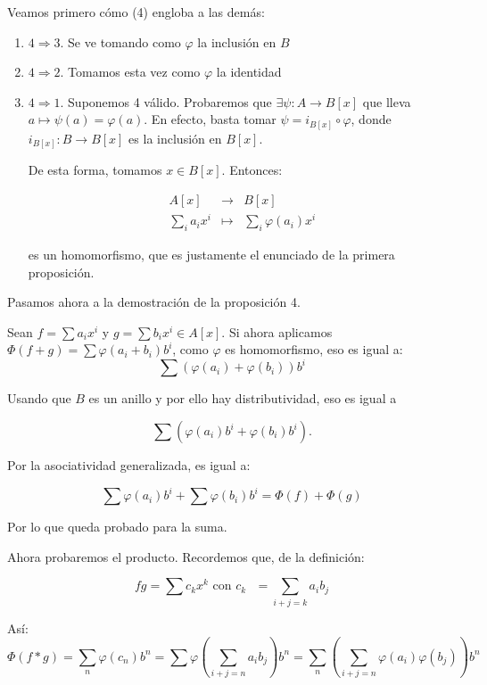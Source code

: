 \documentclass[11pt, a4paper, titlepage]{article}
\makeatletter
\renewenvironment{proof}[1][\proofname] {\vspace{-15pt}\par\pushQED{\qed}\normalfont\topsep6\p@\@plus6\p@\relax\trivlist\item[\hskip\labelsep\it#1\@addpunct{.}]\ignorespaces}{\popQED\endtrivlist\@endpefalse}
\theoremstyle{theorem-style}
\theoremstyle{definition-style}
\theoremstyle{remark-style}
\theoremstyle{example-style}
\newenvironment{nlist}
{\begin{enumerate}
\renewcommand\labelenumi{(\emph{\roman{enumi})}}}
{\end{enumerate}}
\makeatother
\begin{document}
\begin{proof}
Veamos primero cómo (4) engloba a las demás:
\begin{nlist}

\item $4 \Rightarrow 3$. Se ve tomando como $\varphi$ la inclusión en $B$
\item $4 \Rightarrow 2$. Tomamos esta vez como $\varphi$ la identidad
\item $4 \Rightarrow 1$. Suponemos 4 válido. Probaremos que $\exists\psi: A \to B[x]$ que lleva $a \mapsto \psi(a) = \varphi(a)$.
  En efecto, basta tomar $\psi = i_{B[x]} \circ \varphi$, donde $i_{B[x]} : B \to B[x]$ es la inclusión en $B[x]$.


De esta forma, tomamos $x\in B[x]$. Entonces:

\[
\begin{array}{lll}
  
  A[x] & \to & B[x] \\
  \sum_i a_i x^i & \mapsto & \sum_i \varphi(a_i)x^i
\end{array}
\]

es un homomorfismo, que es justamente el enunciado de la primera proposición.

\end{nlist}

Pasamos ahora a la demostración de la proposición 4.


Sean $f = \sum a_i x^i$ y $g = \sum b_i x^i \in A[x]$.
Si ahora aplicamos $\Phi(f+g) = \sum \varphi(a_i + b_i)b^i$, como $\varphi$ es homomorfismo, eso es igual a:
\[
    \sum (\varphi(a_i) + \varphi(b_i))b^i
\]
 
Usando que $B$ es un anillo y por ello hay distributividad, eso es igual a

\[
    \sum (\varphi(a_i)b^i + \varphi(b_i)b^i).
\]
 
Por la asociatividad generalizada, es igual a:

\[
\sum \varphi(a_i)b^i + \sum \varphi(b_i)b^i = \Phi(f) + \Phi(g)
\]

Por lo que queda probado para la suma.
 
Ahora probaremos el producto. Recordemos que, de la definición:
 
\[
fg = \sum c_k x^k \text{ con $c_k$ }  = \sum_{i+j = k} a_ib_j
\]
 
 Así: \[\Phi(f*g) = \sum_n\varphi(c_n)b^n = \sum \varphi\left(\sum_{i+j = n} a_ib_j\right)b^n = \sum_n \left( \sum_{i+j = n} \varphi(a_i)\varphi(b_j)\right)b^n\]
 

\end{proof}
\end{document}
